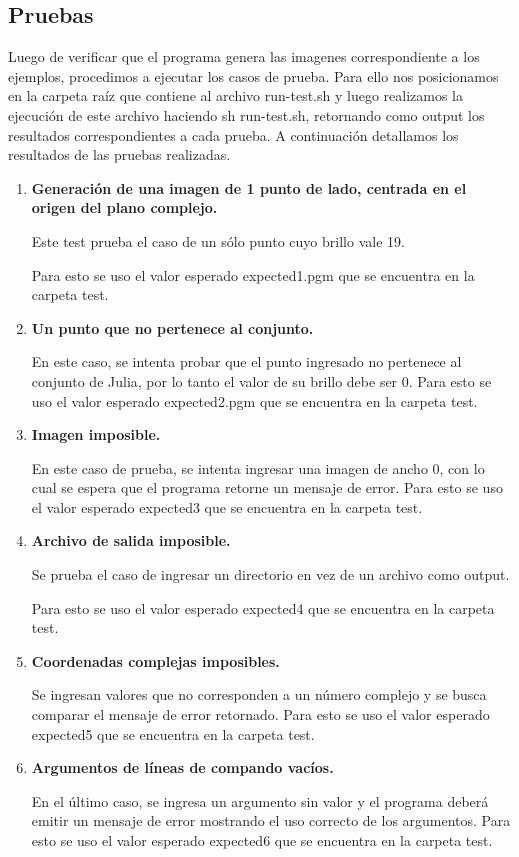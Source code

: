 \documentclass{article}
\begin{document}
\subsection{Pruebas}

Luego de verificar que el programa genera las imagenes correspondiente a los ejemplos, procedimos a ejecutar los casos de prueba. Para ello nos posicionamos en la carpeta raíz que contiene al archivo run-test.sh y luego realizamos la ejecución de este archivo  haciendo sh run-test.sh, retornando como output los resultados correspondientes a cada prueba.
A continuación detallamos los resultados de las pruebas realizadas.


\begin{enumerate}
   
    \item \textbf{Generación de una imagen de 1 punto de lado, centrada en el origen del plano 	complejo.}

	Este test prueba el caso de un sólo punto cuyo brillo vale 19.
	
	Para esto se uso el valor esperado expected1.pgm que se encuentra en la carpeta test.
    
    \item \textbf{Un punto que no pertenece al conjunto.}

	En este caso, se intenta probar que el punto ingresado no pertenece al conjunto de Julia, por lo tanto el valor de su brillo debe ser 0.	
	Para esto se uso el valor esperado expected2.pgm que se encuentra en la carpeta test.
	
    
    \item \textbf{Imagen imposible.}

	En este caso de prueba, se intenta ingresar una imagen de ancho 0, con lo cual se espera que el programa retorne un mensaje de error.	
	Para esto se uso el valor esperado expected3 que se encuentra en la carpeta test.   

	\item \textbf{Archivo de salida imposible.}    
	
	Se prueba el caso de ingresar un directorio en vez de un archivo como output.
	
	Para esto se uso el valor esperado expected4 que se encuentra en la carpeta test.
	
	\item \textbf{Coordenadas complejas imposibles.}   
	
	Se ingresan valores que no corresponden a un número complejo y se busca comparar el mensaje de error retornado.	
	Para esto se uso el valor esperado expected5 que se encuentra en la carpeta test.
	
	\item \textbf{Argumentos de líneas de compando vacíos.}    
	
	En el último caso, se ingresa un argumento sin valor y el programa deberá emitir un mensaje de error mostrando el uso correcto de los argumentos.
	Para esto se uso el valor esperado expected6 que se encuentra en la carpeta test.
    
\end{enumerate}
\end{document}
